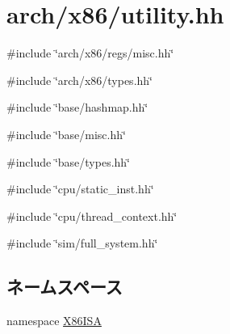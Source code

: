 \hypertarget{x86_2utility_8hh}{
\section{arch/x86/utility.hh}
\label{x86_2utility_8hh}
}
{\ttfamily \#include \char`\"{}arch/x86/regs/misc.hh\char`\"{}}\par
{\ttfamily \#include \char`\"{}arch/x86/types.hh\char`\"{}}\par
{\ttfamily \#include \char`\"{}base/hashmap.hh\char`\"{}}\par
{\ttfamily \#include \char`\"{}base/misc.hh\char`\"{}}\par
{\ttfamily \#include \char`\"{}base/types.hh\char`\"{}}\par
{\ttfamily \#include \char`\"{}cpu/static\_\-inst.hh\char`\"{}}\par
{\ttfamily \#include \char`\"{}cpu/thread\_\-context.hh\char`\"{}}\par
{\ttfamily \#include \char`\"{}sim/full\_\-system.hh\char`\"{}}\par
\subsection*{ネームスペース}
\begin{DoxyCompactItemize}
\item 
namespace \hyperlink{namespaceX86ISA}{X86ISA}
\end{DoxyCompactItemize}
